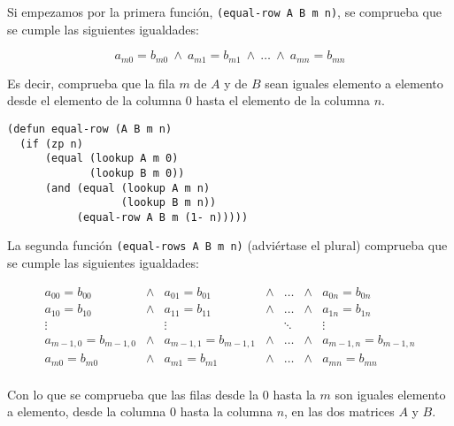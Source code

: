 \documentclass[a4paper,10pt]{article}
\begin{document}
\par \vspace{10pt}		

Si empezamos por la primera función, \texttt{(equal-row A B m n)}, se comprueba que se cumple las siguientes igualdades:

$$a_{m0} = b_{m0}\ \wedge\ a_{m1} = b_{m1}\ \wedge\ \dots\ \wedge\ a_{mn} = b_{mn}$$

\par \vspace{10pt}		

Es decir, comprueba que la fila $m$ de $A$ y de $B$ sean iguales elemento a elemento desde el elemento de la columna 0 hasta el elemento de la columna $n$.

\par \vspace{10pt}		

\begin{lstlisting}[language=clips]
(defun equal-row (A B m n)
  (if (zp n)
      (equal (lookup A m 0)
             (lookup B m 0))
      (and (equal (lookup A m n)
                  (lookup B m n))
           (equal-row A B m (1- n)))))
\end{lstlisting}

\par \vspace{10pt}		

La segunda función \texttt{(equal-rows A B m n)} (adviértase el plural) comprueba que se cumple las siguientes igualdades:

$$
\begin{array}{ccccccccc}
a_{00} = b_{00} & \wedge & a_{01} = b_{01} & \wedge & \dots & \wedge & a_{0n} = b_{0n} \\
a_{10} = b_{10} & \wedge & a_{11} = b_{11} & \wedge & \dots & \wedge & a_{1n} = b_{1n} \\
\vdots & & \vdots & & \ddots & & \vdots\\
a_{m-1,0} = b_{m-1,0} & \wedge & a_{m-1,1} = b_{m-1,1} & \wedge & \dots & \wedge & a_{m-1,n} = b_{m-1,n} \\
a_{m0} = b_{m0} & \wedge & a_{m1} = b_{m1} & \wedge & \dots & \wedge & a_{mn} = b_{mn} \\
\end{array}
$$

\par \vspace{10pt}		

Con lo que se comprueba que las filas desde la 0 hasta la $m$ son iguales elemento a elemento, desde la columna 0 hasta la columna $n$, en las dos matrices $A$ y $B$.
\end{document}
